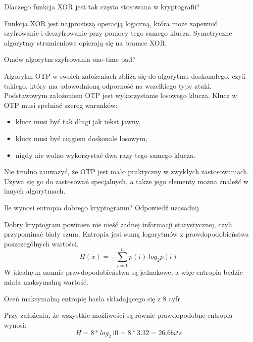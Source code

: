 \documentclass[answers,11pt]{exam}
\begin{document}
\begin{questions}

\question Dlaczego funkcja XOR jest tak często stosowana w kryptografii?
\begin{solution}
Funkcja XOR jest najprostszą operacją logiczną, która może zapewnić szyfrowanie i deszyfrowanie przy pomocy tego samego klucza. Symetryczne algorytmy strumieniowe opierają się na bramce XOR.
\end{solution}

\question Omów algorytm szyfrowania one-time pad?
\begin{solution}
Algorytm OTP w swoich założeniach zbliża się do algorytmu doskonałego, czyli takiego, który ma udowodnioną odporność na wszelkiego typy ataki. Podstawowym założeniem OTP jest wykorzystanie losowego klucza. Klucz w OTP musi spełniać szereg warunków:
\begin{itemize}
\item klucz musi być tak długi jak tekst jawny,
\item klucz musi być ciągiem doskonale losowym,
\item nigdy nie wolno wykorzystać dwa razy tego samego klucza.
\end{itemize}
Nie trudno zauważyć, że OTP jest mało praktyczny w zwykłych zastosowaniach. Używa się go do zastosowań specjalnych, a także jego elementy można znaleźć w innych algorytmach.
\end{solution}

\question Ile wynosi entropia dobrego kryptogramu? Odpowiedź uzasadnij.
\begin{solution}
Dobry kryptogram powinien nie nieść żadnej informacji statystycznej, czyli przypominać biały szum. Entropia jest sumą logarytmów z prawdopodobieństwa poszczególnych wartości.
\begin{equation}
H(x)= - \sum_{i=1}^n p(i) \ log_2 p(i)
\end{equation}
W idealnym szumie prawdopodobieństwa są jednakowe, a więc entropia będzie miała maksymalną wartość. 
\end{solution}

\question Oceń maksymalną entropię hasła składającego się z 8 cyfr.
\begin{solution}
Przy założeniu, że wszystkie możliwości są równie prawdopodobne entropia wynosi:
\begin{equation}
H = 8 * log_2 10 = 8 * 3.32 = 26.6 bits
\end{equation}
\end{solution}


\end{questions}
\end{document}
